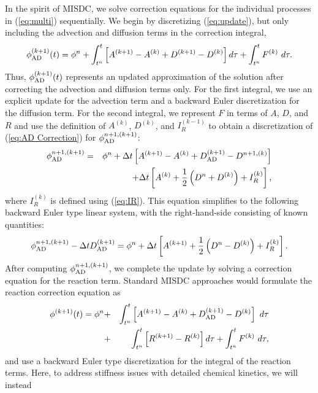 In the spirit of MISDC, we solve correction equations for the individual processes in 
(\ref{eq:multi}) sequentially.  We begin by discretizing (\ref{eq:update}), but only
including the advection and diffusion terms in the correction integral,
\begin{equation}
\phi_{\rm AD}^{(k+1)}(t) = \phi^n + \int_{t^n}^t \left[A^{(k+1)} - A^{(k)} + D^{(k+1)} - D^{(k)}\right]d\tau + \int_{t^n}^t F^{(k)}~d\tau.\label{eq:AD Correction}
\end{equation}
Thus, $\phi_{\rm AD}^{(k+1)}(t)$ represents an updated approximation of the solution after correcting the
advection and diffusion terms only.  For the first integral, we use an explicit update for the advection term and a 
backward Euler discretization for the diffusion term.
For the second integral, we represent $F$ in terms of $A$, $D$, and $R$ and
use the definition
of $A^{(k)}$, $D^{(k)}$, and $I_R^{(k-1)}$ to obtain
a discretization of (\ref{eq:AD Correction}) for 
$\phi_{\rm AD}^{n+1,(k+1)}$:
\begin{eqnarray}
\phi_{\rm AD}^{n+1,(k+1)} &=& \phi^n + \Delta t  \left[A^{(k+1)} - A^{(k)} + D_{\rm AD}^{(k+1)} - D^{n+1,(k)}\right] \nonumber \\
&&\hspace{0.5cm}+ \Delta t\left[A^{(k)} + \frac{1}{2}\left(D^n + D^{(k)}\right) + I_R^{(k)}\right],
\end{eqnarray}
where $I_R^{(k)}$ is defined using (\ref{eq:IR}).
This equation simplifies to the following backward Euler type linear system, with the
right-hand-side consisting of known quantities:
\begin{equation}
\phi_{\rm AD}^{n+1,(k+1)} - \Delta t D_{\rm AD}^{(k+1)} = \phi^n + \Delta t \left[A^{(k+1)} + \frac{1}{2}\left(D^n - D^{(k)}\right) + I_R^{(k)}\right].
\end{equation}
After computing $\phi_{\rm AD}^{n+1,(k+1)}$, we complete the update by solving a correction equation for
the reaction term.  Standard MISDC approaches would formulate the reaction correction equation as
\begin{eqnarray}
{\phi}^{(k+1)}(t) = \phi^n &+& \int_{t^n}^t \left[ A^{(k+1)} - A^{(k)} + D_{\rm AD}^{(k+1)} - D^{(k)} \right]~d\tau \nonumber \\
&+& \int_{t^n}^t \left[R^{(k+1)} - R^{(k)}\right]d\tau + \int_{t^n}^t F^{(k)}~d\tau, \label{eq:stdreact}
\end{eqnarray}
and use a backward Euler type discretization for the integral of the reaction terms.
Here, to address stiffness issues with detailed chemical kinetics, we will instead
